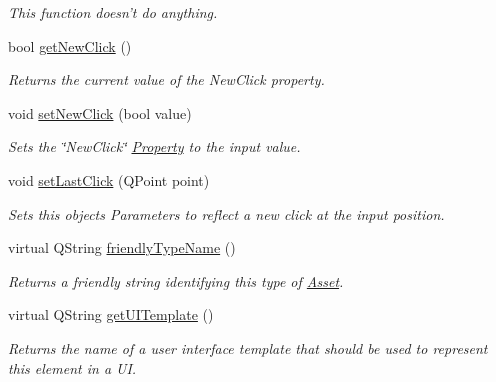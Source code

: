 \begin{DoxyCompactItemize}
\begin{DoxyCompactList}\small\item\em This function doesn't do anything. \end{DoxyCompactList}\item 
bool \hyperlink{class_picto_1_1_operator_click_parameter_af96030946876adb7bdfdd3dbe33b3404}{get\-New\-Click} ()
\begin{DoxyCompactList}\small\item\em Returns the current value of the New\-Click property. \end{DoxyCompactList}\item 
\hypertarget{class_picto_1_1_operator_click_parameter_a06775e32557efa7963bed824a482613e}{void \hyperlink{class_picto_1_1_operator_click_parameter_a06775e32557efa7963bed824a482613e}{set\-New\-Click} (bool value)}\label{class_picto_1_1_operator_click_parameter_a06775e32557efa7963bed824a482613e}

\begin{DoxyCompactList}\small\item\em Sets the \char`\"{}\-New\-Click\char`\"{} \hyperlink{class_picto_1_1_property}{Property} to the input value. \end{DoxyCompactList}\item 
void \hyperlink{class_picto_1_1_operator_click_parameter_acec2127f2b6c18313f3136b2dd31c065}{set\-Last\-Click} (Q\-Point point)
\begin{DoxyCompactList}\small\item\em Sets this objects Parameters to reflect a new click at the input position. \end{DoxyCompactList}\item 
virtual Q\-String \hyperlink{class_picto_1_1_operator_click_parameter_a1ef65b48a76eca3b323a78d52bdac515}{friendly\-Type\-Name} ()
\begin{DoxyCompactList}\small\item\em Returns a friendly string identifying this type of \hyperlink{class_picto_1_1_asset}{Asset}. \end{DoxyCompactList}\item 
\hypertarget{class_picto_1_1_operator_click_parameter_ac40d7661e8b7a5438b67cdba4f8a1605}{virtual Q\-String \hyperlink{class_picto_1_1_operator_click_parameter_ac40d7661e8b7a5438b67cdba4f8a1605}{get\-U\-I\-Template} ()}\label{class_picto_1_1_operator_click_parameter_ac40d7661e8b7a5438b67cdba4f8a1605}

\begin{DoxyCompactList}\small\item\em Returns the name of a user interface template that should be used to represent this element in a U\-I. \end{DoxyCompactList}\end{DoxyCompactItemize}
